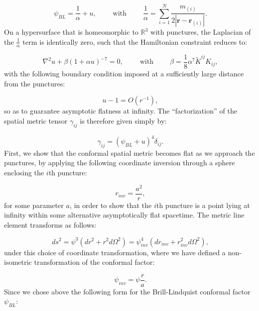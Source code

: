 \documentclass{article}
\begin{document}
\begin{equation}
\psi_{BL} = \frac{1}{\alpha} + u, \qquad \text{ with } \qquad \frac{1}{\alpha} = \sum_{i = 1}^{N} \frac{m_{\left( i \right)}}{2 \left\lvert \mathbf{r} - \mathbf{r}_{\left( i \right)} \right\rvert}.
\end{equation}
On a hypersurface that is homeomorphic to ${\mathbb{R}^3}$ with punctures, the Laplacian of the ${\frac{1}{\alpha}}$ term is identically zero, such that the Hamiltonian constraint reduces to:

\begin{equation}
\nabla^2 u + \beta \left( 1 + \alpha u \right)^{-7} = 0, \qquad \text{ with } \qquad \beta = \frac{1}{8} \alpha^7 \tilde{K}^{i j} K_{i j},
\end{equation}
with the following boundary condition imposed at a sufficiently large distance from the punctures:

\begin{equation}
u - 1 = O \left( r^{-1} \right),
\end{equation}
so as to guarantee asymptotic flatness at infinity. The ``factorization'' of the spatial metric tensor ${\gamma_{i j}}$ is therefore given simply by:

\begin{equation}
\gamma_{i j} = \left( \psi_{BL} + u \right)^4 \delta_{i j}.
\end{equation}
First, we show that the conformal spatial metric becomes flat as we approach the punctures, by applying the following coordinate inversion through a sphere enclosing the $i$th puncture:

\begin{equation}
r_{inv} = \frac{a^2}{r},
\end{equation}
for some parameter $a$, in order to show that the $i$th puncture is a point lying at infinity within some alternative asymptotically flat spacetime. The metric line element transforms as follows:

\begin{equation}
ds^2 = \psi^3 \left( dr^2 + r^2 d \Omega^2 \right) = \psi_{inv}^{4} \left( d r_{inv} + r_{inv}^{2} d \Omega^2 \right),
\end{equation}
under this choice of coordinate transformation, where we have defined a non-isometric transformation of the conformal factor: 

\begin{equation}
\psi_{inv} = \psi \frac{r}{a}.
\end{equation}
Since we chose above the following form for the Brill-Lindquist conformal factor ${\psi_{BL}}$:
\end{document}
